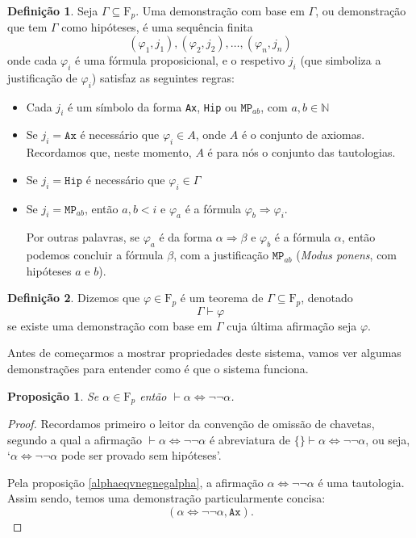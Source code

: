 \documentclass{report}
\newtheorem*{prop*}{Proposição}
\theoremstyle{definition}
\newtheorem{definicao}{Definição}
\theoremstyle{remark}
\newcommand{\N}{\mathbb{N}}
\newcommand{\F}{\mathrm{F}}
\newcommand{\imply}{\mathbin{\Rightarrow}}
\newcommand{\eqv}{\mathbin{\Leftrightarrow}}
\begin{document}
	\begin{definicao}
	Seja $\Gamma \subseteq \F_p$. Uma demonstração com base em $\Gamma$, ou demonstração que tem $\Gamma$ como hipóteses, é uma sequência finita
	\[(\varphi_1, j_1), (\varphi_2, j_2), \dots, (\varphi_n, j_n)\]
	onde cada $\varphi_i$ é uma fórmula proposicional, e o respetivo $j_i$ (que simboliza a justificação de $\varphi_i$) satisfaz as seguintes regras:
	
	\begin{itemize}
	\item Cada $j_i$ é um símbolo da forma \texttt{Ax}, \texttt{Hip} ou $\texttt{MP}_{ab}$, com $a,b \in \N$
	
	\item Se $j_i = \texttt{Ax}$ é necessário que $\varphi_i \in A$, onde $A$ é o conjunto de axiomas. Recordamos que, neste momento, $A$ é para nós o conjunto das tautologias.
	
	\item Se $j_i = \texttt{Hip}$ é necessário que $\varphi_i \in \Gamma$
	
	\item Se $j_i = \texttt{MP}_{ab}$, então $a, b < i$ e $\varphi_a$ é a fórmula $\varphi_b \imply \varphi_i$.
	
	Por outras palavras, se $\varphi_a$ é da forma $\alpha \imply \beta$ e $\varphi_b$ é a fórmula $\alpha$, então podemos concluir a fórmula $\beta$, com a justificação $\texttt{MP}_{ab}$ (\textit{Modus ponens}, com hipóteses $a$ e $b$).
	\end{itemize}
	\end{definicao}
	
	\begin{definicao}
	Dizemos que $\varphi \in \F_p$ é um teorema de $\Gamma \subseteq \F_p$, denotado
	\[\Gamma \vdash \varphi\]
	se existe uma demonstração com base em $\Gamma$ cuja última afirmação seja $\varphi$.
	\end{definicao}
	
	Antes de começarmos a mostrar propriedades deste sistema, vamos ver algumas demonstrações para entender como é que o sistema funciona.
	
	\begin{prop*}
	Se $\alpha \in \F_p$ então $\vdash \alpha \eqv \neg \neg \alpha$.
	\end{prop*}
	\begin{proof}
	Recordamos primeiro o leitor da convenção de omissão de chavetas, segundo a qual a afirmação $\vdash \alpha \eqv \neg \neg \alpha$ é abreviatura de $\{\} \vdash \alpha \eqv \neg \neg \alpha$, ou seja, `$\alpha \eqv \neg \neg \alpha$ pode ser provado sem hipóteses'.
	
	Pela proposição \ref{alphaeqvnegnegalpha}, a afirmação $\alpha \eqv \neg \neg \alpha$ é uma tautologia. Assim sendo, temos uma demonstração particularmente concisa:
	\[(\alpha \eqv \neg \neg \alpha, \texttt{Ax}).\]
	\end{proof}
	
\end{document}
